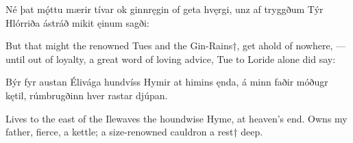 Né þat mǫ́ttu \hld mærir tívar
ok ginnręgin \hld of geta hvęrgi,
unz af tryggðum \hld Týr Hlórriða
ástráð mikit \hld ęinum sagði:

But that might the renowned Tues and the Gin-Rains†, get ahold of nowhere, — until out of loyalty, a great word of loving advice, Tue to Loride alone did say:

Býr fyr austan \hld Élivága
hundvíss Hymir \hld at himins ęnda,
á minn faðir \hld móðugr kętil,
rúmbrugðinn hver \hld rastar djúpan. 

Lives to the east of the Ilewaves the houndwise Hyme\footnotemark[1], at heaven’s end. Owns my father, fierce, a kettle; a size-renowned cauldron a rest† deep.
